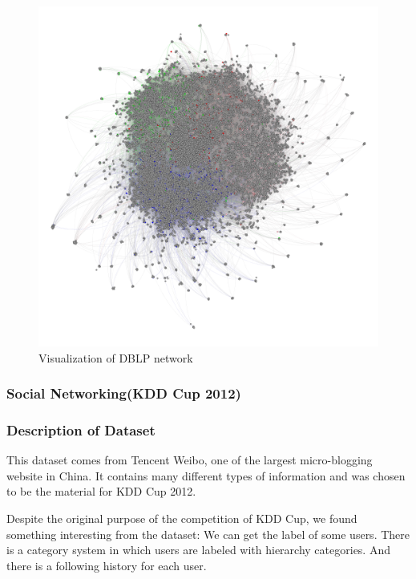 \begin{figure}[!ht]
	\centering
	\begin{minipage}[b]{0.5\linewidth}
	\centering
	\includegraphics[width=\textwidth]{FIG/dblp.png}
	\caption{Visualization of DBLP network}
	\label{fig:figure1}
	\end{minipage}
\end{figure}	

\subsubsection{Social Networking(KDD Cup 2012)}

\subsubsection*{Description of Dataset}
This dataset comes from Tencent Weibo, one of the largest micro-blogging website in China.
It contains many different types of information and was chosen to be the material for KDD Cup 2012.

Despite the original purpose of the competition of KDD Cup, we found something interesting from the dataset:
We can get the label of some users. There is a category system in which users are labeled with hierarchy categories. And there is a following history for each user.

